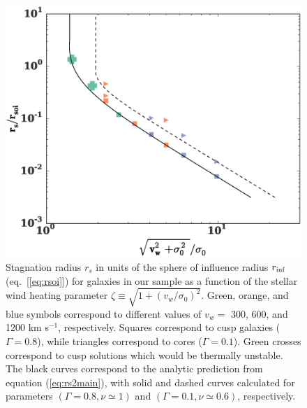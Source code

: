 \documentclass[usenatbib,fleqn]{mn2e}
\newcommand{\densSlope}{\nu}
\begin{document}
\begin{figure}
  \includegraphics[width=\columnwidth]{rs.eps}
  \caption{\label{fig:stag} Stagnation radius $r_{s}$ in units of the
    sphere of influence radius $r_{\rm inf}$ (eq.~[\ref{eq:rsoi}]) for
    galaxies in our sample as a function of the stellar wind heating
    parameter $\zeta \equiv \sqrt{1+(v_w/\sigma_0)^{2}}$.
    Green, orange, and blue symbols correspond to different values of
    $v_{w} =$ 300, 600, and 1200 km s$^{-1}$, respectively.  Squares
    correspond to cusp galaxies ($\Gamma = 0.8$), while triangles
    correspond to cores ($\Gamma = 0.1$). Green crosses correspond to
    cusp solutions which would be thermally unstable. The black curves
    correspond to the analytic prediction from equation
    (\ref{eq:rs2main}), with solid and dashed curves calculated for
    parameters $(\Gamma=0.8, \densSlope\simeq1)$ and
    $(\Gamma=0.1,\densSlope\simeq0.6)$, respectively. }
\end{figure}
\end{document}
